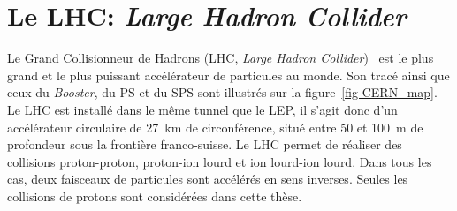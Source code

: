 \section{Le LHC: \emph{Large Hadron Collider}}\label{chapter-LHC-section-LHC}
Le Grand Collisionneur de Hadrons (LHC, \emph{Large Hadron Collider})~\cite{LHC_paper1,LHC_paper2,LHC_paper3} est le plus grand et le plus puissant accélérateur de particules au monde.
Son tracé ainsi que ceux du \emph{Booster}, du PS et du SPS sont illustrés sur la figure~\ref{fig-CERN_map}.
Le LHC est installé dans le même tunnel que le LEP, il s'agit donc d'un accélérateur circulaire de \SI{27}{\kilo\meter} de circonférence, situé entre \num{50} et \SI{100}{\meter} de profondeur sous la frontière franco-suisse.
Le LHC permet de réaliser des collisions proton-proton, proton-ion lourd et ion lourd-ion lourd.
Dans tous les cas, deux faisceaux de particules sont accélérés en sens inverses.
Seules les collisions de protons sont considérées dans cette thèse.
